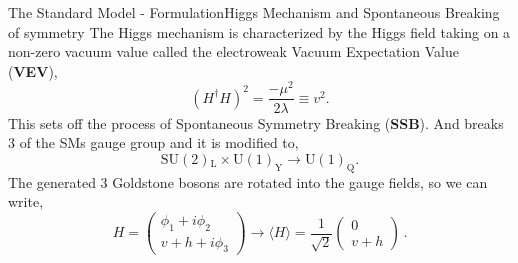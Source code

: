 \documentclass[10pt,xcolor=dvipsnames,mathserif]{beamer}
\newcommand{\U}[1]{\mathrm{U}(1)_{\mathrm{#1}}}			%
\begin{document}
    \begin{frame}{The Standard Model - Formulation}{Higgs Mechanism and Spontaneous Breaking of symmetry}
        The Higgs mechanism is characterized by the Higgs field taking on a non-zero vacuum value called the electroweak Vacuum Expectation Value (\textbf{VEV}),
        \begin{equation*}
            (H^\dagger H)^2 = \frac{-\mu^2}{2\lambda} \equiv  v^2  .
        \end{equation*} 
        This sets off the process of Spontaneous Symmetry Breaking (\textbf{SSB}). And breaks 3 of the SMs gauge group and it is modified to, 
        \begin{equation*}
            {\mathrm{SU}(2)}\mathrm{_{L}} \times \U{Y} \rightarrow \U{Q}.  
        \end{equation*}
        The generated 3 Goldstone bosons are rotated into the gauge fields, so we can write, 
        \begin{equation*}
            H = \begin{pmatrix}
            \phi_1 + i \phi_2 \\ 
            v + h + i \phi_3 
            \end{pmatrix}   \rightarrow  \langle H  \rangle =  \frac{1}{\sqrt{2}} \begin{pmatrix}
            0 \\ 
            v + h 
            \end{pmatrix} \, .
        \end{equation*}
    \end{frame}
\end{document}
